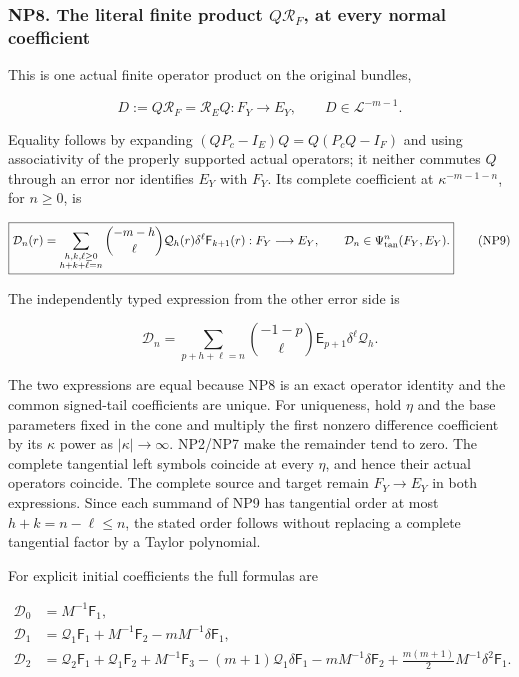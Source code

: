 \documentclass[
  11pt,
]{article}
\begin{document}
\subsubsection{\texorpdfstring{NP8. The literal finite product
\(Q\mathcal R _F\), at every normal
coefficient}{NP8. The literal finite product Q\textbackslash mathcal R \_F, at every normal coefficient}}\label{np8.-the-literal-finite-product-qmathcal-r-_f-at-every-normal-coefficient}

This is one actual finite operator product on the original bundles,

\[
 D:=Q\mathcal R_F=\mathcal R_EQ:F_Y\longrightarrow E_Y,
 \qquad D\in\mathcal L^{-m-1}.
 \tag{NP8}
\]

Equality follows by expanding \((QP_c-I_E)Q=Q(P_cQ-I_F)\) and using
associativity of the properly supported actual operators; it neither
commutes \(Q\) through an error nor identifies \(E_Y\) with \(F_Y\). Its
complete coefficient at \(\kappa ^{-m-1-n}\), for \(n\ge0\), is

\[
 \boxed{\displaystyle
 \mathcal D_n(r)=
 \sum_{\substack{h,k,\ell\ge0\\h+k+\ell=n}}
   \binom{-m-h}{\ell}\mathcal Q_h(r)\delta^\ell\mathsf F_{k+1}(r)
 :F_Y\longrightarrow E_Y,\qquad
 \mathcal D_n\in\Psi_{\rm tan}^{n}(F_Y,E_Y).}
 \tag{NP9}
\]

The independently typed expression from the other error side is

\[
 \mathcal D_n=
 \sum_{p+h+\ell=n}
    \binom{-1-p}{\ell}\mathsf E_{p+1}\delta^\ell\mathcal Q_h.
 \tag{NP10}
\]

The two expressions are equal because NP8 is an exact operator identity
and the common signed-tail coefficients are unique. For uniqueness, hold
\(\eta \) and the base parameters fixed in the cone and multiply the
first nonzero difference coefficient by its \(\kappa \) power as
\(|\kappa |\to \infty \). NP2/NP7 make the remainder tend to zero. The
complete tangential left symbols coincide at every \(\eta \), and hence
their actual operators coincide. The complete source and target remain
\(F_Y\to E_Y\) in both expressions. Since each summand of NP9 has
tangential order at most \(h+k=n-\ell \le n\), the stated order follows
without replacing a complete tangential factor by a Taylor polynomial.

For explicit initial coefficients the full formulas are

\[
 \begin{aligned}
 \mathcal D_0&=M^{-1}\mathsf F_1,\\
 \mathcal D_1&=\mathcal Q_1\mathsf F_1+M^{-1}\mathsf F_2
                -mM^{-1}\delta\mathsf F_1,\\
 \mathcal D_2&=\mathcal Q_2\mathsf F_1+\mathcal Q_1\mathsf F_2
      +M^{-1}\mathsf F_3
      -(m+1)\mathcal Q_1\delta\mathsf F_1
      -mM^{-1}\delta\mathsf F_2
      +\frac{m(m+1)}2M^{-1}\delta^2\mathsf F_1.
 \end{aligned}
 \tag{NP11}
\]
\end{document}
